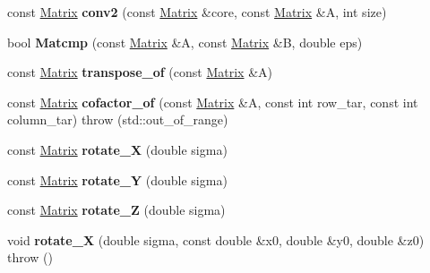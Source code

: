 \begin{DoxyCompactItemize}
const \hyperlink{classkerbal_1_1math_1_1_matrix}{Matrix} {\bfseries conv2} (const \hyperlink{classkerbal_1_1math_1_1_matrix}{Matrix} \&core, const \hyperlink{classkerbal_1_1math_1_1_matrix}{Matrix} \&A, int size)
\item 
\mbox{\label{namespacekerbal_1_1math_a8f7d6c2db6135e41865ea093889ec62b}} 
bool {\bfseries Matcmp} (const \hyperlink{classkerbal_1_1math_1_1_matrix}{Matrix} \&A, const \hyperlink{classkerbal_1_1math_1_1_matrix}{Matrix} \&B, double eps)
\item 
\mbox{\label{namespacekerbal_1_1math_adec4a1bf155ede449b52dea7c8ee0c6a}} 
const \hyperlink{classkerbal_1_1math_1_1_matrix}{Matrix} {\bfseries transpose\+\_\+of} (const \hyperlink{classkerbal_1_1math_1_1_matrix}{Matrix} \&A)
\item 
\mbox{\label{namespacekerbal_1_1math_a2b2a8f889ef0e623577894ea7392d472}} 
const \hyperlink{classkerbal_1_1math_1_1_matrix}{Matrix} {\bfseries cofactor\+\_\+of} (const \hyperlink{classkerbal_1_1math_1_1_matrix}{Matrix} \&A, const int row\+\_\+tar, const int column\+\_\+tar)  throw (std\+::out\+\_\+of\+\_\+range)
\item 
\mbox{\label{namespacekerbal_1_1math_ab0c3317760651c36ccae631e6826ff32}} 
const \hyperlink{classkerbal_1_1math_1_1_matrix}{Matrix} {\bfseries rotate\+\_\+X} (double sigma)
\item 
\mbox{\label{namespacekerbal_1_1math_a8ae35ffad8d30503414300f7461e50d6}} 
const \hyperlink{classkerbal_1_1math_1_1_matrix}{Matrix} {\bfseries rotate\+\_\+Y} (double sigma)
\item 
\mbox{\label{namespacekerbal_1_1math_a4380bab6442decaf30f51695058e42da}} 
const \hyperlink{classkerbal_1_1math_1_1_matrix}{Matrix} {\bfseries rotate\+\_\+Z} (double sigma)
\item 
\mbox{\label{namespacekerbal_1_1math_a37e3d41de6613f1820954b46fc431762}} 
void {\bfseries rotate\+\_\+X} (double sigma, const double \&x0, double \&y0, double \&z0)  throw ()
\item 
\mbox{\label{namespacekerbal_1_1math_a128fd0aa8828144d753d6d000dba8406}} 

\end{DoxyCompactItemize}
